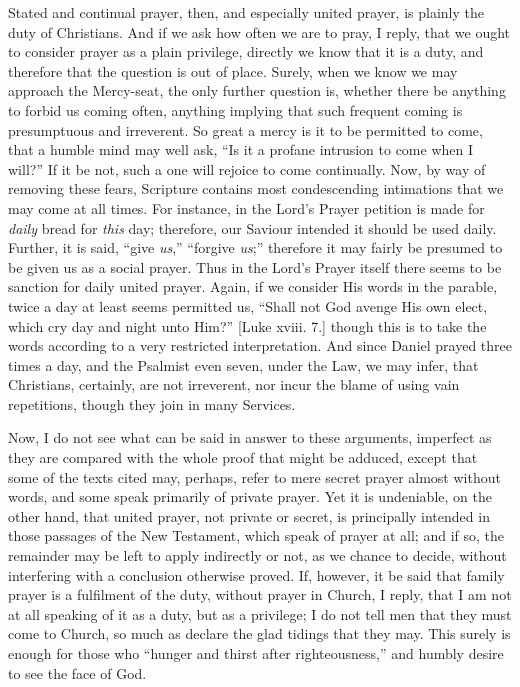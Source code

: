 Stated and continual prayer, then, and especially united prayer, is
plainly the duty of Christians. And if we ask how often we are to
pray, I reply, that we ought to consider prayer as a plain privilege,
directly we know that it is a duty, and therefore that the question is
out of place. Surely, when we know we may approach the Mercy-seat, the
only further question is, whether there be anything to forbid us
coming often, anything implying that such frequent coming is
presumptuous and irreverent. So great a mercy is it to be permitted to
come, that a humble mind may well ask, ``Is it a profane intrusion
to come when I will?'' If it be not, such a one will rejoice to
come continually. Now, by way of removing these fears, Scripture
contains most condescending intimations that we may come at all times.
For instance, in the Lord's Prayer petition is made for \emph{daily}
bread for \emph{this} day; therefore, our Saviour intended it should
be used daily. Further, it is said, ``give \emph{us},''
``forgive \emph{us};'' therefore it may fairly be presumed to
be given us as a social prayer. Thus in the Lord's Prayer itself
there seems to be sanction for daily united prayer. Again, if we
consider His words in the parable, twice a day at least seems
permitted us, ``Shall not God avenge His own elect, which cry day
and night unto Him?'' [Luke xviii. 7.] though this is to take the
words according to a very restricted interpretation. And since Daniel
prayed three times a day, and the Psalmist even seven, under the Law,
we may infer, that Christians, certainly, are not irreverent, nor
incur the blame of using vain repetitions, though they join in many
Services.

Now, I do not see what can be said in answer to these arguments,
imperfect as they are compared with the whole proof that might be
adduced, except that some of the texts cited may, perhaps, refer to
mere secret prayer almost without words, and some speak primarily of
private prayer. Yet it is undeniable, on the other hand, that united
prayer, not private or secret, is principally intended in those
passages of the New Testament, which speak of prayer at all; and if
so, the remainder may be left to apply indirectly or not, as we chance
to decide, without interfering with a conclusion otherwise proved. If,
however, it be said that family prayer is a fulfilment of the duty,
without prayer in Church, I reply, that I am not at all speaking of it
as a duty, but as a privilege; I do not tell men that they must come
to Church, so much as declare the glad tidings that they may. This
surely is enough for those who ``hunger and thirst after
righteousness,'' and humbly desire to see the face of God.

